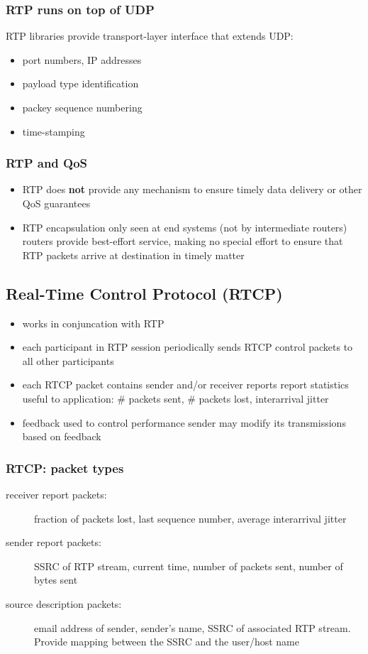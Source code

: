 \subsubsection{RTP runs on top of UDP}
RTP libraries provide transport-layer interface that extends UDP:
\begin{itemize}
	\item port numbers, IP addresses
	\item payload type identification
	\item packey sequence numbering
	\item time-stamping
\end{itemize}
\subsubsection{RTP and QoS}
\begin{itemize}
	\item RTP does \textbf{not} provide any mechanism to ensure timely data delivery or other QoS guarantees
	\item RTP encapsulation only seen at end systems (not by intermediate routers)
	\subitem routers provide best-effort service, making no special effort to ensure that RTP packets arrive at destination in timely matter
\end{itemize}

\subsection{Real-Time Control Protocol (RTCP)}
\begin{itemize}
	\item works in conjuncation with RTP
	\item each participant in RTP session periodically sends RTCP control packets to all other participants
	\item each RTCP packet contains sender and/or receiver reports
	\subitem report statistics useful to application: \# packets sent, \# packets lost, interarrival jitter
	\item feedback used to control performance
	\subitem sender may modify its transmissions based on feedback
\end{itemize}
\subsubsection{RTCP: packet types}
\begin{description}
	\item[receiver report packets:] fraction of packets lost, last sequence number, average interarrival jitter
	\item[sender report packets:] SSRC of RTP stream, current time, number of packets sent, number of bytes sent
	\item[source description packets:] email address of sender, sender's name, SSRC of associated RTP stream. Provide mapping between the SSRC and the user/host name
\end{description}

